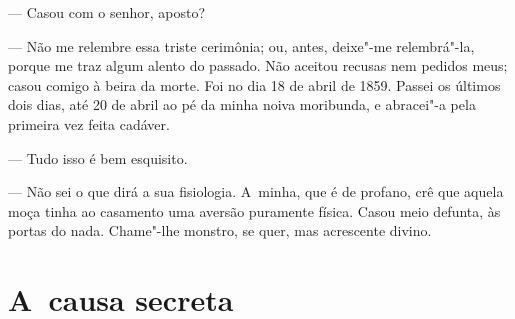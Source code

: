\begin{linenumbers}
--- Casou com o senhor, aposto?

--- Não me relembre essa triste cerimônia; ou, antes, deixe"-me
relembrá"-la, porque me traz algum alento do passado. Não aceitou recusas
nem pedidos meus; casou comigo à beira da morte. Foi no dia 18 de abril
de 1859. Passei os últimos dois dias, até 20 de abril ao pé da minha
noiva moribunda, e abracei"-a pela primeira vez feita cadáver.

--- Tudo isso é bem esquisito.

--- Não sei o que dirá a sua fisiologia. A~minha, que é de profano, crê
que aquela moça tinha ao casamento uma aversão puramente física. Casou
meio defunta, às portas do nada. Chame"-lhe monstro, se quer, mas
acrescente divino.

\end{linenumbers}

\chapter{A~causa secreta}

